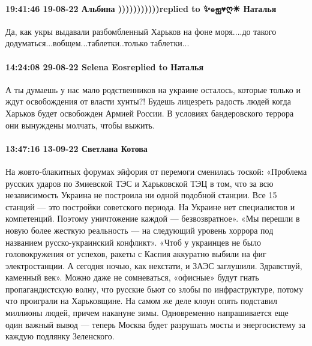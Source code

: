  
 
 
 
 

\paragraph{19:41:46 19-08-22 Альбина )))))))))))replied to ✨๑ஐ♥ღ☀ Наталья💛}

Да, как укры выдавали разбомбленный Харьков на фоне моря....до такого
додуматься...вобщем...таблетки..только таблетки...

\paragraph{14:24:08 29-08-22 Selena Eosreplied to Наталья}

А ты думаешь у нас мало родственников на украине осталось, которые только и
ждут освобождения от власти хунты?! Будешь лицезреть радость людей когда
Харьков будет освобожден Армией России. В условиях бандеровского террора они
вынуждены молчать, чтобы выжить.

\paragraph{13:47:16 13-09-22 Светлана Котова}

На жовто-блакитных форумах эйфория от перемоги сменилась тоской: «Проблема русских ударов по Змиевской ТЭС и Харьковской ТЭЦ в том, что за всю независимость Украина не построила ни одной подобной станции. Все 15 станций — это постройки советского периода. На Украине нет специалистов и компетенций. Поэтому уничтожение каждой — безвозвратное».
«Мы перешли в новую более жесткую реальность — на следующий уровень хоррора под названием русско-украинский конфликт».
«Чтоб у украинцев не было головокружения от успехов, ракеты с Каспия аккуратно выбили на фиг электростанции. А сегодня ночью, как некстати, и ЗАЭС заглушили. Здравствуй, каменный век».
Можно даже не сомневаться, «офисные» будут гнать пропагандистскую волну, что русские бьют со злобы по инфраструктуре, потому что проиграли на Харьковщине. На самом же деле клоун опять подставил миллионы людей, причем накануне зимы. Одновременно напрашивается еще один важный вывод — теперь Москва будет разрушать мосты и энергосистему за каждую подлянку Зеленского.

